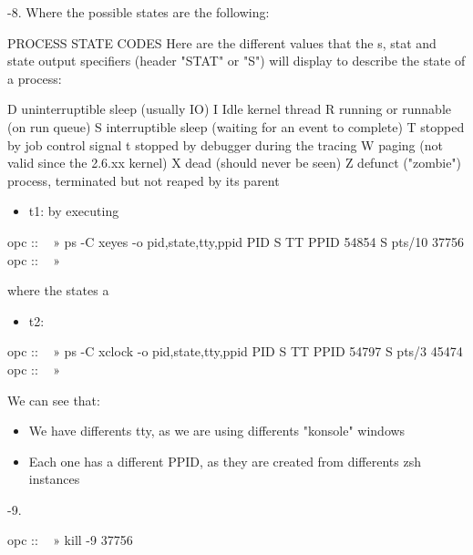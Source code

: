 \documentclass[a4paper]{article}
\begin{document}
{-\allowbreak}8.    Where the possible states are the following:

\begin{plain}
PROCESS STATE CODES
       Here are the different values that the s, stat and state output specifiers (header "STAT" or "S") will display to describe the state of
       a process:

               D    uninterruptible sleep (usually IO)
               I    Idle kernel thread
               R    running or runnable (on run queue)
               S    interruptible sleep (waiting for an event to complete)
               T    stopped by job control signal
               t    stopped by debugger during the tracing
               W    paging (not valid since the 2.6.xx kernel)
               X    dead (should never be seen)
               Z    defunct ("zombie") process, terminated but not reaped by its parent
\end{plain}

\begin{itemize}
\item 
t1: by executing
\end{itemize}

\begin{plain}
opc :: ~ » ps -C xeyes -o pid,state,tty,ppid
    PID S TT          PPID
  54854 S pts/10     37756
opc :: ~ » 
\end{plain}

where the states a

\begin{itemize}
\item 
t2: 
\end{itemize}

\begin{plain}
opc :: ~ » ps -C xclock -o pid,state,tty,ppid
    PID S TT          PPID
  54797 S pts/3      45474
opc :: ~ » 
\end{plain}

We can see that:

\begin{itemize}
\item 
We have differents tty, as we are using differents "konsole" windows
\item 
Each one has a different PPID, as they are created from differents zsh instances
\end{itemize}

{-\allowbreak}9.

\begin{plain}
opc :: ~ » kill -9 37756
\end{plain}
\end{document}
